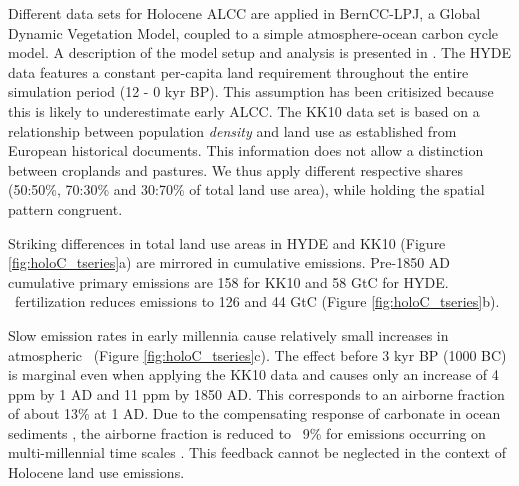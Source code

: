 Different data sets for Holocene ALCC are applied in BernCC-LPJ, a Global Dynamic Vegetation Model, coupled to a simple atmosphere-ocean carbon cycle model. A description of the model setup and analysis is presented in \citet{stocker11bg}. The HYDE data \citep{kleingoldewijk2011geb} features a constant per-capita land requirement throughout the entire simulation period (12 - 0 kyr BP). This assumption has been critisized \citep{kaplan09, stocker11bg} because this is likely to underestimate early ALCC. The KK10 data set \citet{kaplan11} is based on a relationship between population {\it density} and land use as established from European historical documents. This information does not allow a distinction between croplands and pastures. We thus apply different respective shares (50:50\%, 70:30\% and 30:70\% of total land use area), while holding the spatial pattern congruent.


 
Striking differences in total land use areas in HYDE and KK10 (Figure \ref{fig:holoC_tseries}a) are mirrored in cumulative emissions. Pre-1850 AD cumulative primary emissions are 158 for KK10 and 58 GtC for HYDE. \coo\ fertilization reduces emissions to 126 and 44 GtC (Figure \ref{fig:holoC_tseries}b).

Slow emission rates in early millennia cause relatively small increases in atmospheric \coo\ (Figure \ref{fig:holoC_tseries}c). The effect before 3 kyr BP (1000 BC) is marginal even when applying the KK10 data and causes only an increase of 4 ppm by 1 AD and 11 ppm by 1850 AD. This corresponds to an airborne fraction of about 13\% at 1 AD. Due to the compensating response of carbonate in ocean sediments \citep{archer97grl}, the airborne fraction is reduced to ~9\% for emissions occurring on multi-millennial time scales \citep{joos96tel, stocker11bg}. This feedback cannot be neglected in the context of Holocene land use emissions.

